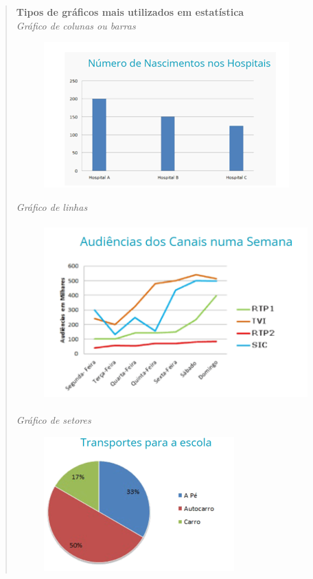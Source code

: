\begin{quote}
\noindent\textbf{Tipos de gráficos mais utilizados em estatística}\\

\noindent\textit{Gráfico de colunas ou barras}\\

\begin{figure}[h]
\centering\includegraphics[width=3.71875in,height=2.20833in]{./imgSAEB_6_MAT/media/image77.png}
\end{figure}

\noindent\textit{Gráfico de linhas}\\


\begin{figure}[h]
\centering\includegraphics[width=4.1875in,height=2.6875in]{./imgSAEB_6_MAT/media/image79.png}
\end{figure}

\noindent\textit{Gráfico de setores}\\

\begin{figure}[h]
\centering\includegraphics[width=2.88542in,height=2.03125in]{./imgSAEB_6_MAT/media/image80.png}
\end{figure}
\end{quote}

